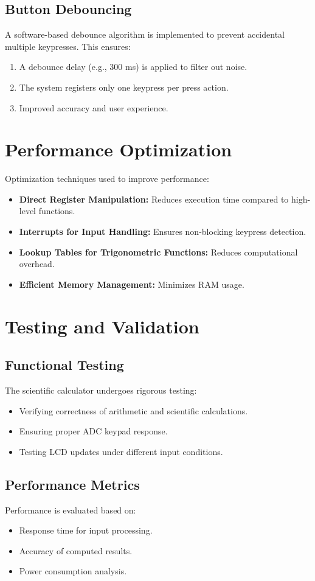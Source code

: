 \documentclass[journal]{IEEEtran}
\begin{document}
\subsection{Button Debouncing}
A software-based debounce algorithm is implemented to prevent accidental multiple keypresses. This ensures:
\begin{enumerate}
    \item A debounce delay (e.g., 300 ms) is applied to filter out noise.
    \item The system registers only one keypress per press action.
    \item Improved accuracy and user experience.
\end{enumerate}

\section{Performance Optimization}
Optimization techniques used to improve performance:
\begin{itemize}
    \item \textbf{Direct Register Manipulation:} Reduces execution time compared to high-level functions.
    \item \textbf{Interrupts for Input Handling:} Ensures non-blocking keypress detection.
    \item \textbf{Lookup Tables for Trigonometric Functions:} Reduces computational overhead.
    \item \textbf{Efficient Memory Management:} Minimizes RAM usage.
\end{itemize}

\section{Testing and Validation}
\subsection{Functional Testing}
The scientific calculator undergoes rigorous testing:
\begin{itemize}
    \item Verifying correctness of arithmetic and scientific calculations.
    \item Ensuring proper ADC keypad response.
    \item Testing LCD updates under different input conditions.
\end{itemize}

\subsection{Performance Metrics}
Performance is evaluated based on:
\begin{itemize}
    \item Response time for input processing.
    \item Accuracy of computed results.
    \item Power consumption analysis.
\end{itemize}
\end{document}
